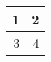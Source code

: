 \documentclass[preview]{standalone}
\begin{document}
\begin{tabular}{|r|r|}
\hline
1 & 2 \\ \hline
3 & 4 \\ \hline
\end{tabular}
\end{document}
